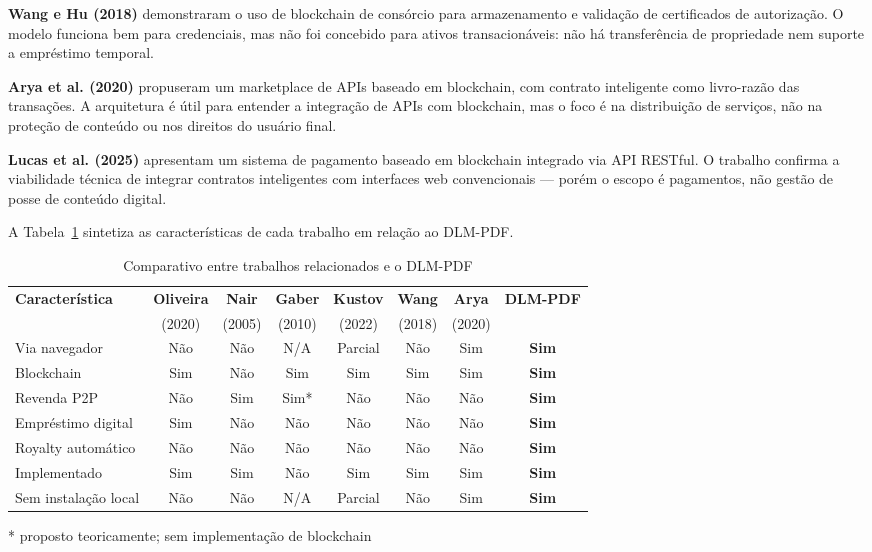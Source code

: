 \documentclass[12pt]{article}
\begin{document}
\textbf{Wang e Hu (2018)} demonstraram o uso de blockchain de consórcio para armazenamento e validação de certificados de autorização. O modelo funciona bem para credenciais, mas não foi concebido para ativos transacionáveis: não há transferência de propriedade nem suporte a empréstimo temporal.

\textbf{Arya et al. (2020)} propuseram um marketplace de APIs baseado em blockchain, com contrato inteligente como livro-razão das transações. A arquitetura é útil para entender a integração de APIs com blockchain, mas o foco é na distribuição de serviços, não na proteção de conteúdo ou nos direitos do usuário final.

\textbf{Lucas et al. (2025)} apresentam um sistema de pagamento baseado em blockchain integrado via API RESTful. O trabalho confirma a viabilidade técnica de integrar contratos inteligentes com interfaces web convencionais — porém o escopo é pagamentos, não gestão de posse de conteúdo digital.

A Tabela~\ref{tab:relacionados} sintetiza as características de cada trabalho em relação ao DLM-PDF.

\begin{table}[H]
\centering
\caption{Comparativo entre trabalhos relacionados e o DLM-PDF}
\label{tab:relacionados}
\begin{tabular}{|l|c|c|c|c|c|c|c|}
\hline
\textbf{Característica}  & \textbf{Oliveira} & \textbf{Nair}  & \textbf{Gaber} & \textbf{Kustov} & \textbf{Wang}  & \textbf{Arya}  & \textbf{DLM-PDF} \\
                         & (2020)            & (2005)         & (2010)         & (2022)          & (2018)         & (2020)         & \\
\hline
Via navegador            & Não    & Não    & N/A    & Parcial & Não    & Sim    & \textbf{Sim}  \\
\hline
Blockchain               & Sim    & Não    & Sim    & Sim     & Sim    & Sim    & \textbf{Sim}  \\
\hline
Revenda P2P              & Não    & Sim    & Sim*   & Não     & Não    & Não    & \textbf{Sim}  \\
\hline
Empréstimo digital       & Sim    & Não    & Não    & Não     & Não    & Não    & \textbf{Sim}  \\
\hline
Royalty automático       & Não    & Não    & Não    & Não     & Não    & Não    & \textbf{Sim}  \\
\hline
Implementado             & Sim    & Sim    & Não    & Sim     & Sim    & Sim    & \textbf{Sim}  \\
\hline
Sem instalação local     & Não    & Não    & N/A    & Parcial & Não    & Sim    & \textbf{Sim}  \\
\hline
\end{tabular}

\medskip
\footnotesize{* proposto teoricamente; sem implementação de blockchain}
\end{table}
\end{document}
